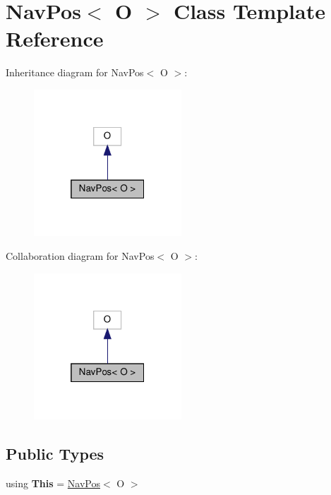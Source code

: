 \hypertarget{classNavPos}{}\section{Nav\+Pos$<$ O $>$ Class Template Reference}
\label{classNavPos}


Inheritance diagram for Nav\+Pos$<$ O $>$\+:\nopagebreak
\begin{figure}[H]
\begin{center}
\leavevmode
\includegraphics[width=157pt]{classNavPos__inherit__graph}
\end{center}
\end{figure}


Collaboration diagram for Nav\+Pos$<$ O $>$\+:\nopagebreak
\begin{figure}[H]
\begin{center}
\leavevmode
\includegraphics[width=157pt]{classNavPos__coll__graph}
\end{center}
\end{figure}
\subsection*{Public Types}
\begin{DoxyCompactItemize}
\item 
\mbox{\label{classNavPos_a268fcc9fb18f271913e2af12243cfaa0}} 
using {\bfseries This} = \hyperlink{classNavPos}{Nav\+Pos}$<$ O $>$
\end{DoxyCompactItemize}
